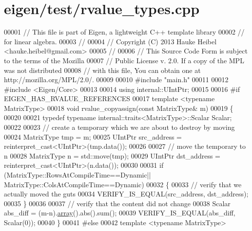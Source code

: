 \hypertarget{eigen_2test_2rvalue__types_8cpp_source}{}\section{eigen/test/rvalue\+\_\+types.cpp}
\label{eigen_2test_2rvalue__types_8cpp_source}

\begin{DoxyCode}
00001 \textcolor{comment}{// This file is part of Eigen, a lightweight C++ template library}
00002 \textcolor{comment}{// for linear algebra.}
00003 \textcolor{comment}{//}
00004 \textcolor{comment}{// Copyright (C) 2013 Hauke Heibel <hauke.heibel@gmail.com>}
00005 \textcolor{comment}{//}
00006 \textcolor{comment}{// This Source Code Form is subject to the terms of the Mozilla}
00007 \textcolor{comment}{// Public License v. 2.0. If a copy of the MPL was not distributed}
00008 \textcolor{comment}{// with this file, You can obtain one at http://mozilla.org/MPL/2.0/.}
00009 
00010 \textcolor{preprocessor}{#include "main.h"}
00011 
00012 \textcolor{preprocessor}{#include <Eigen/Core>}
00013 
00014 \textcolor{keyword}{using} internal::UIntPtr;
00015 
00016 \textcolor{preprocessor}{#if EIGEN\_HAS\_RVALUE\_REFERENCES}
00017 \textcolor{keyword}{template} <\textcolor{keyword}{typename} MatrixType>
00018 \textcolor{keywordtype}{void} rvalue\_copyassign(\textcolor{keyword}{const} MatrixType& m)
00019 \{
00020 
00021   \textcolor{keyword}{typedef} \textcolor{keyword}{typename} internal::traits<MatrixType>::Scalar Scalar;
00022   
00023   \textcolor{comment}{// create a temporary which we are about to destroy by moving}
00024   MatrixType tmp = m;
00025   UIntPtr src\_address = \textcolor{keyword}{reinterpret\_cast<}UIntPtr\textcolor{keyword}{>}(tmp.data());
00026   
00027   \textcolor{comment}{// move the temporary to n}
00028   MatrixType n = std::move(tmp);
00029   UIntPtr dst\_address = \textcolor{keyword}{reinterpret\_cast<}UIntPtr\textcolor{keyword}{>}(n.data());
00030 
00031   \textcolor{keywordflow}{if} (MatrixType::RowsAtCompileTime==Dynamic|| MatrixType::ColsAtCompileTime==Dynamic)
00032   \{
00033     \textcolor{comment}{// verify that we actually moved the guts}
00034     VERIFY\_IS\_EQUAL(src\_address, dst\_address);
00035   \}
00036 
00037   \textcolor{comment}{// verify that the content did not change}
00038   Scalar abs\_diff = (m-n).\hyperlink{class_eigen_1_1array}{array}().abs().sum();
00039   VERIFY\_IS\_EQUAL(abs\_diff, Scalar(0));
00040 \}
00041 \textcolor{preprocessor}{#else}
00042 \textcolor{keyword}{template} <\textcolor{keyword}{typename} MatrixType>

\end{DoxyCode}
